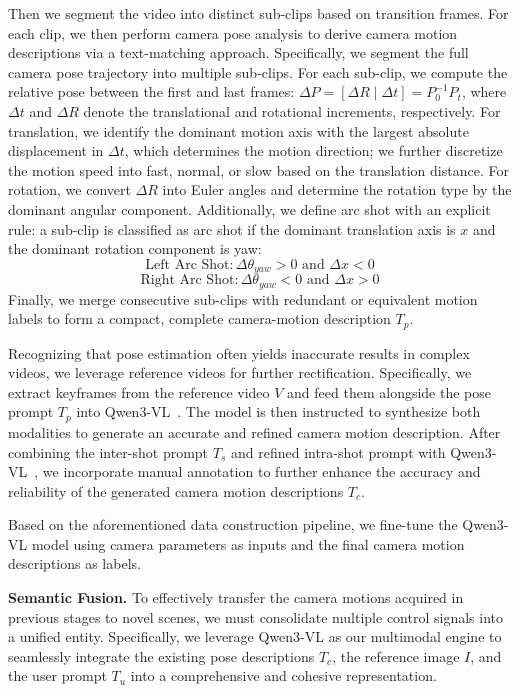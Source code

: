 \documentclass[letterpaper]{article} %
\begin{document}
Then we segment the video into distinct sub-clips based on transition frames. For each clip, we then perform camera pose analysis to derive camera motion descriptions via a text-matching approach. Specifically, we segment the full camera pose trajectory into multiple sub-clips. For each sub-clip, we compute the relative pose between the first and last frames: $\Delta P = [\Delta R \mid \Delta t] = P_0^{-1}P_t$, where $\Delta t$ and $\Delta R$ denote the translational and rotational increments, respectively. For translation, we identify the dominant motion axis with the largest absolute displacement in $\Delta t$, which determines the motion direction; we further discretize the motion speed into fast, normal, or slow based on the translation distance. For rotation, we convert $\Delta R$ into Euler angles and determine the rotation type by the dominant angular component.
Additionally, we define arc shot with an explicit rule: a sub-clip is classified as arc shot if the dominant translation axis is $x$ and the dominant rotation component is yaw:
\begin{equation}
    \text{Left Arc Shot}: \Delta \theta_{yaw} > 0 \text{ and } \Delta x < 0
\end{equation}
\begin{equation}
    \text{Right Arc Shot}: \Delta \theta_{yaw} < 0 \text{ and }  \Delta x > 0 
\end{equation}
Finally, we merge consecutive sub-clips with redundant or equivalent motion labels to form a compact, complete camera-motion description $T_p$. 

Recognizing that pose estimation often yields inaccurate results in complex videos, we leverage reference videos for further rectification. Specifically, we extract keyframes from the reference video $V$ and feed them alongside the pose prompt $T_p$ into Qwen3-VL~\cite{bai2025qwen3}. The model is then instructed to synthesize both modalities to generate an accurate and refined camera motion description. After combining the inter-shot prompt $T_s$ and refined intra-shot prompt with Qwen3-VL~\cite{bai2025qwen3}, we incorporate manual annotation to further enhance the accuracy and reliability of the generated camera motion descriptions $T_c$.

Based on the aforementioned data construction pipeline, we fine-tune the Qwen3-VL model using camera parameters as inputs and the final camera motion descriptions as labels.


\textbf{Semantic Fusion.} To effectively transfer the camera motions acquired in previous stages to novel scenes, we must consolidate multiple control signals into a unified entity. Specifically, we leverage Qwen3-VL as our multimodal engine to seamlessly integrate the existing pose descriptions $T_c$, the reference image $I$, and the user prompt $T_u$ into a comprehensive and cohesive representation.
\end{document}
